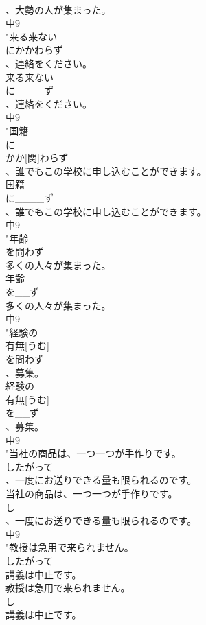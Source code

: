\documentclass[8pt]{extreport}
\begin{document}
\begin{CJK}{UTF8}{min}
\\	、大勢の人が集まった。
\\	中9
\\	"来る来ない
\\	にかかわらず
\\	、連絡をください。
\\	来る来ない
\\	に____ず
\\	、連絡をください。
\\	中9
\\	"国籍
\\	に
\\	かか[関]わらず
\\	、誰でもこの学校に申し込むことができます。
\\	国籍
\\	に____ず
\\	、誰でもこの学校に申し込むことができます。
\\	中9
\\	"年齢
\\	を問わず
\\	多くの人々が集まった。
\\	年齢
\\	を__ず
\\	多くの人々が集まった。
\\	中9
\\	"経験の
\\	有無[うむ]
\\	を問わず
\\	、募集。
\\	経験の
\\	有無[うむ]
\\	を__ず
\\	、募集。
\\	中9
\\	"当社の商品は、一つ一つが手作りです。
\\	したがって
\\	、一度にお送りできる量も限られるのです。
\\	当社の商品は、一つ一つが手作りです。
\\	し____
\\	、一度にお送りできる量も限られるのです。
\\	中9
\\	"教授は急用で来られません。
\\	したがって
\\	講義は中止です。
\\	教授は急用で来られません。
\\	し____
\\	講義は中止です。

\end{CJK}
\end{document}
